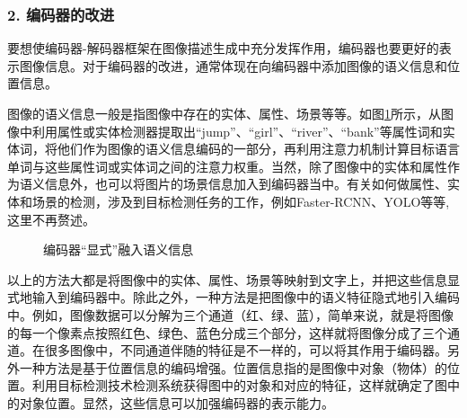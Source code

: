 
\subsubsection{2. 编码器的改进}

\parinterval 要想使编码器-解码器框架在图像描述生成中充分发挥作用，编码器也要更好的表示图像信息。对于编码器的改进，通常体现在向编码器中添加图像的语义信息和位置信息。

\parinterval 图像的语义信息一般是指图像中存在的实体、属性、场景等等。如图\ref{fig:17-17}所示，从图像中利用属性或实体检测器提取出“jump”、“girl”、“river”、“bank”等属性词和实体词，将他们作为图像的语义信息编码的一部分，再利用注意力机制计算目标语言单词与这些属性词或实体词之间的注意力权重。当然，除了图像中的实体和属性作为语义信息外，也可以将图片的场景信息加入到编码器当中。有关如何做属性、实体和场景的检测，涉及到目标检测任务的工作，例如Faster-RCNN、YOLO等等,这里不再赘述。

\begin{figure}[htp]
\centering

\caption{编码器“显式”融入语义信息}
\label{fig:17-17}
\end{figure}

\parinterval 以上的方法大都是将图像中的实体、属性、场景等映射到文字上，并把这些信息显式地输入到编码器中。除此之外，一种方法是把图像中的语义特征隐式地引入编码中。例如，图像数据可以分解为三个通道（红、绿、蓝），简单来说，就是将图像的每一个像素点按照红色、绿色、蓝色分成三个部分，这样就将图像分成了三个通道。在很多图像中，不同通道伴随的特征是不一样的，可以将其作用于编码器。另外一种方法是基于位置信息的编码增强。位置信息指的是图像中对象（物体）的位置。利用目标检测技术检测系统获得图中的对象和对应的特征，这样就确定了图中的对象位置。显然，这些信息可以加强编码器的表示能力。

